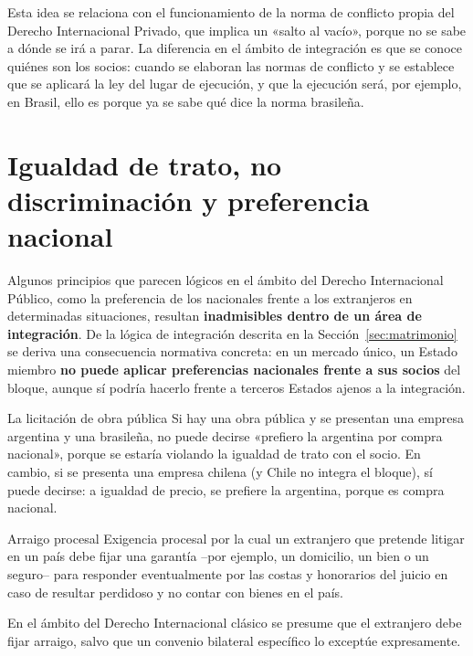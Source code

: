 \documentclass[12pt,oneside]{book}
\begin{document}
Esta idea se relaciona con el funcionamiento de la norma de conflicto propia del Derecho Internacional Privado, que implica un «salto al vacío», porque no se sabe a dónde se irá a parar. La diferencia en el ámbito de integración es que se conoce quiénes son los socios: cuando se elaboran las normas de conflicto y se establece que se aplicará la ley del lugar de ejecución, y que la ejecución será, por ejemplo, en Brasil, ello es porque ya se sabe qué dice la norma brasileña.

\section{Igualdad de trato, no discriminación y preferencia nacional}

Algunos principios que parecen lógicos en el ámbito del Derecho Internacional Público, como la preferencia de los nacionales frente a los extranjeros en determinadas situaciones, resultan \textbf{inadmisibles dentro de un área de integración}. De la lógica de integración descrita en la Sección~\ref{sec:matrimonio} se deriva una consecuencia normativa concreta: en un mercado único, un Estado miembro \textbf{no puede aplicar preferencias nacionales frente a sus socios} del bloque, aunque sí podría hacerlo frente a terceros Estados ajenos a la integración.

\begin{ejemplo}{La licitación de obra pública}
Si hay una obra pública y se presentan una empresa argentina y una brasileña, no puede decirse «prefiero la argentina por compra nacional», porque se estaría violando la igualdad de trato con el socio. En cambio, si se presenta una empresa chilena (y Chile no integra el bloque), sí puede decirse: a igualdad de precio, se prefiere la argentina, porque es compra nacional.
\end{ejemplo}

\begin{definicion}{Arraigo procesal}
Exigencia procesal por la cual un extranjero que pretende litigar en un país debe fijar una garantía --por ejemplo, un domicilio, un bien o un seguro-- para responder eventualmente por las costas y honorarios del juicio en caso de resultar perdidoso y no contar con bienes en el país.
\end{definicion}

En el ámbito del Derecho Internacional clásico se presume que el extranjero debe fijar arraigo, salvo que un convenio bilateral específico lo exceptúe expresamente.
\end{document}
